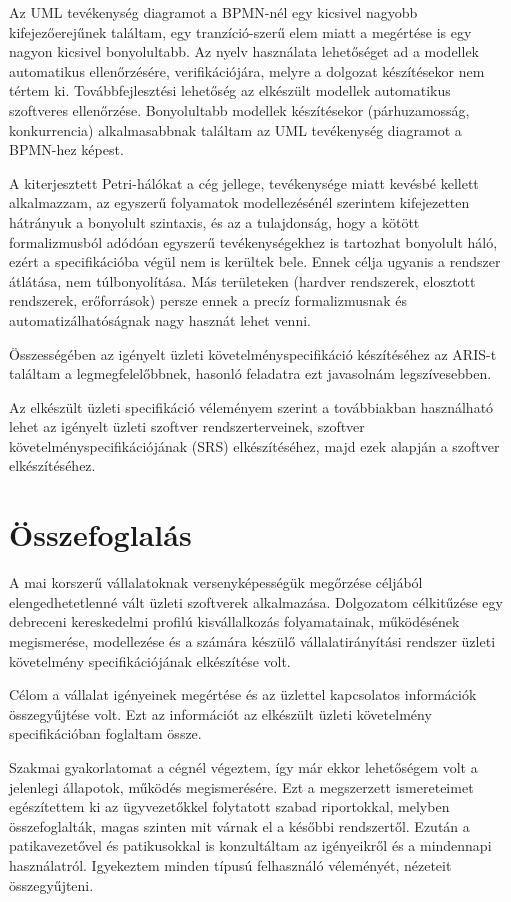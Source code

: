 \documentclass[12pt]{article}
\begin{document}
Az UML tevékenység diagramot a BPMN-nél egy kicsivel nagyobb kifejezőerejűnek találtam, egy tranzíció-szerű elem miatt a megértése is egy nagyon kicsivel bonyolultabb. Az nyelv használata lehetőséget ad a modellek automatikus ellenőrzésére, verifikációjára, melyre a dolgozat készítésekor nem tértem ki. Továbbfejlesztési lehetőség az elkészült modellek automatikus szoftveres ellenőrzése. Bonyolultabb modellek készítésekor (párhuzamosság, konkurrencia) alkalmasabbnak találtam az UML tevékenység diagramot a BPMN-hez képest.

A kiterjesztett Petri-hálókat a cég jellege, tevékenysége miatt kevésbé kellett alkalmazzam, az egyszerű folyamatok modellezésénél szerintem kifejezetten hátrányuk a bonyolult szintaxis, és az a tulajdonság, hogy a kötött formalizmusból adódóan egyszerű tevékenységekhez is tartozhat bonyolult háló, ezért a specifikációba végül nem is kerültek bele. Ennek célja ugyanis a rendszer átlátása, nem túlbonyolítása. Más területeken (hardver rendszerek, elosztott rendszerek, erőforrások) persze ennek a precíz formalizmusnak és automatizálhatóságnak nagy hasznát lehet venni.

Összességében az igényelt üzleti követelményspecifikáció készítéséhez az ARIS-t találtam a legmegfelelőbbnek, hasonló feladatra ezt javasolnám legszívesebben.

Az elkészült üzleti specifikáció véleményem szerint a továbbiakban használható lehet az igényelt üzleti szoftver rendszerterveinek, szoftver követelményspecifikációjának (SRS) elkészítéséhez, majd ezek alapján a szoftver elkészítéséhez.

\newpage
\section*{Összefoglalás}

A mai korszerű vállalatoknak versenyképességük megőrzése céljából elengedhetetlenné vált üzleti szoftverek alkalmazása. Dolgozatom célkitűzése egy debreceni kereskedelmi profilú kisvállalkozás folyamatainak, működésének megismerése, modellezése és a számára készülő vállalatirányítási rendszer üzleti követelmény specifikációjának elkészítése volt. 

Célom a vállalat igényeinek megértése és az üzlettel kapcsolatos információk összegyűjtése volt. Ezt az információt az elkészült üzleti követelmény specifikációban foglaltam össze.

Szakmai gyakorlatomat a cégnél végeztem, így már ekkor lehetőségem volt a jelenlegi állapotok, működés megismerésére. Ezt a megszerzett ismereteimet egészítettem ki az ügyvezetőkkel folytatott szabad riportokkal, melyben összefoglalták, magas szinten mit várnak el a későbbi rendszertől. Ezután a patikavezetővel és patikusokkal is konzultáltam az igényeikről és a mindennapi használatról. Igyekeztem minden típusú felhasználó véleményét, nézeteit összegyűjteni.
\end{document}
